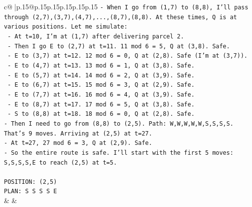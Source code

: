 \documentclass{article}
\begin{document}
{\begin{supertabular}{c@{$\;$}|p{.15\linewidth}@{}p{.15\linewidth}p{.15\linewidth}p{.15\linewidth}p{.15\linewidth}p{.15\linewidth}}
{{{\texttt{{-} When I go from (1,7) to (8,8), I'll pass through (2,7),(3,7),(4,7),...,(8,7),(8,8). At these times, Q is at various positions. Let me simulate:} \\
\texttt{  {-} At t=10, I'm at (1,7) after delivering parcel 2.} \\
\texttt{  {-} Then I go E to (2,7) at t=11. 11 mod 6 = 5, Q at (3,8). Safe.} \\
\texttt{  {-} E to (3,7) at t=12. 12 mod 6 = 0, Q at (2,8). Safe (I'm at (3,7)).} \\
\texttt{  {-} E to (4,7) at t=13. 13 mod 6 = 1, Q at (3,8). Safe.} \\
\texttt{  {-} E to (5,7) at t=14. 14 mod 6 = 2, Q at (3,9). Safe.} \\
\texttt{  {-} E to (6,7) at t=15. 15 mod 6 = 3, Q at (2,9). Safe.} \\
\texttt{  {-} E to (7,7) at t=16. 16 mod 6 = 4, Q at (3,9). Safe.} \\
\texttt{  {-} E to (8,7) at t=17. 17 mod 6 = 5, Q at (3,8). Safe.} \\
\texttt{  {-} S to (8,8) at t=18. 18 mod 6 = 0, Q at (2,8). Safe.} \\
\texttt{{-} Then I need to go from (8,8) to (2,5). Path: W,W,W,W,W,S,S,S,S. That's 9 moves. Arriving at (2,5) at t=27.} \\
\texttt{{-} At t=27, 27 mod 6 = 3, Q at (2,9). Safe.} \\
\texttt{{-} So the entire route is safe. I'll start with the first 5 moves: S,S,S,S,E to reach (2,5) at t=5.} \\
\\ 
\texttt{POSITION: (2,5)} \\
\texttt{PLAN: S S S S E} \\
            }
        }
    }
    & & \\ \\


\end{supertabular}}
\end{document}
